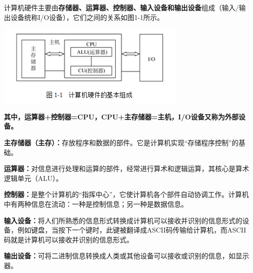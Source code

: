 计算机硬件主要由\textbf{存储器、运算器、控制器、输入设备和输出设备}组成（{输入/输出设备统{称I/O设备}}），它们之间的关系如图1-1所示。

\includegraphics[width=3.70833in,height=1.58333in]{png-jpeg-pics/F1D18B7B5F3613863EFB8F429BC35B5B.png}

\textbf{其中，运算器+控制器=CPU，CPU+主存储器=主机，I/O设备又称为外部设备。}

\textbf{主存储器（主存）：}存放程序和数据的部件。它是计算机实现``存储程序控制''的基础。

\textbf{运算器：}对信息进行处理和运算的部件，经常进行算术和逻辑运算，其核心是算术逻辑单元（ALU）。

\textbf{控制器：}是整个计算机的``指挥中心''，它使计算机各个部件自动协调工作。计算机中有两种信息在流动：一种是控制信息；另一种是数据信息。

\textbf{输入设备：}将人们所熟悉的信息形式转换成计算机可以接收并识别的信息形式的设备，例如键盘，当按下一个键时，此键被翻译成ASCII码传输给计算机，而ASCII码就是计算机可以接收并识别的信息形式。

\textbf{输出设备：}可将二进制信息转换成人类或其他设备可以接收或识别的信息，如显示器。
